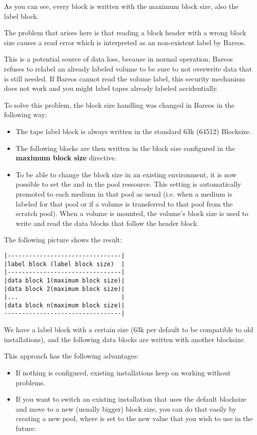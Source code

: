 As you can see, every block is written with the maximum block size, also the label block.

The problem that arises here is that reading a block header with a wrong block size causes
a read error which is interpreted as an non-existent label by Bareos.

This is a potential source of data loss, because in normal operation, Bareos refuses to
relabel an already labeled volume to be sure to not overwrite data that is still needed.
If Bareos cannot read the volume label, this security mechanism does not work and you might
label tapes already labeled accidentially.

To solve this problem, the block size handling was changed in Bareos  in the following way:
\begin{itemize}
\item  The tape label block is always written in the standard 63k (64512) Blocksize.
\item  The following blocks are then written in the block size configured in the {\bf maximum block size} directive.
\item  To be able to change the block size in an existing environment, it is now
possible to set the  and  in the
pool ressource. This setting is automatically promoted to each medium in
that pool as usual (i.e. when a medium is labeled for that pool or if a volume is transferred to that pool from the scratch pool).
When a volume is mounted, the volume's block size is
used to write and read the data blocks that follow the header block.
\end{itemize}

The following picture shows the result:
\begin{verbatim}
|--------------------------------|
|label block (label block size)  |
|--------------------------------|
|data block 1(maximum block size)|
|data block 2(maximum block size)|
|...                             |
|data block n(maximum block size)|
---------------------------------|
\end{verbatim}
We have a label block with a certain size (63k per default to be compatible to old installations),
and the following data blocks are written with another blocksize.


This approach has the following advantages:
\begin{itemize}
\item If nothing is configured, existing installations keep on working without problems.
\item If you want to switch an existing installation that uses the default
blocksize and move to a new (usually bigger) block size, you can do that
easily by creating a new pool, where  is set to the new
value that you wish to use in the future:
\end{itemize}


